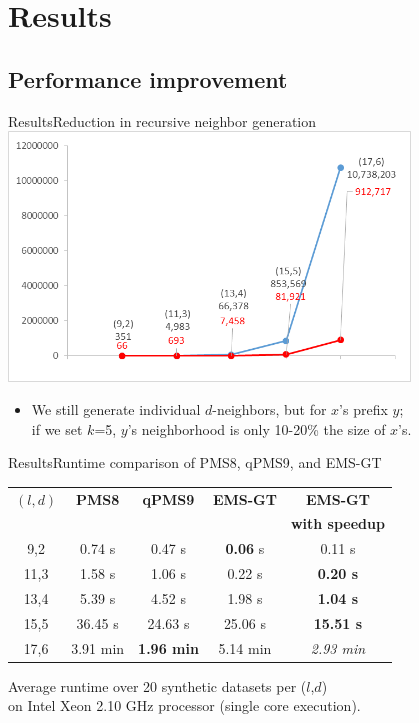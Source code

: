 \documentclass[pdf,xcolor={dvipsnames}]{beamer}
\begin{document}
\section{Results}
	\subsection{Performance improvement}
	\begin{frame}{Results}{Reduction in recursive neighbor generation} %
		{\centering\includegraphics[width=0.8\textwidth]{img/nbrhd_growth_compare.png}\\}
		\begin{itemize}
		\item We still generate individual $d$-neighbors, but for $x$'s prefix $y$;\\
		if we set $k$=5, $y$'s neighborhood is only 10-20\% the size of $x$'s.
		\end{itemize}
		\end{frame}

	\begin{frame}{Results}{Runtime comparison of PMS8, qPMS9, and EMS-GT}
	\begin{table}[ht] %
			\small
			\renewcommand{\arraystretch}{1.3}
			\centering
			\begin{tabular}{|c|c|c|c|c|}
			\hline \bfseries\boldmath $(l,d)$ & \bfseries PMS8 & \bfseries qPMS9 & \bfseries EMS-GT & \bfseries EMS-GT\\
			& & & & \bfseries with speedup\\
			\hline
			 9,2 &  0.74 s  &  0.47 s & {\bf 0.06 }s & {    0.11 s}\\
			11,3 &  1.58 s  &  1.06 s &  0.22 s & {\bf 0.20 s}\\
			13,4 &  5.39 s  &  4.52 s &  1.98 s & {\bf 1.04 s}\\
			15,5 & 36.45 s  & 24.63 s & 25.06 s & {\bf15.51 s}\\
			17,6 &  3.91 min & \textbf{1.96 min} & 5.14 min & {\emph{2.93 min}}\\
			\hline\end{tabular}
			\end{table}

		{\centering \footnotesize Average runtime over 20 synthetic datasets per ($l$,$d$)\\
		on Intel Xeon 2.10 GHz processor (single core execution).\\}
	\end{frame}
\end{document}
